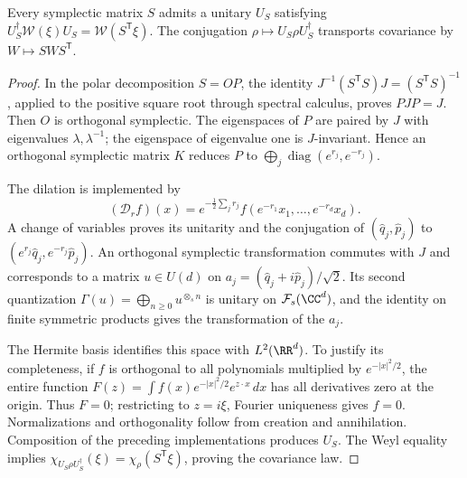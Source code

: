 \begin{lemma}
\label{app:lem:implementacion-simplectica}
Every symplectic matrix \(S\) admits a unitary \(U_S\) satisfying \(U_S^\dagger\mathcal W(\xi)U_S=\mathcal W(S^{\mathsf T}\xi)\). The conjugation \(\rho\mapsto U_S\rho U_S^\dagger\) transports covariance by \(W\mapsto SWS^{\mathsf T}\).
\end{lemma}
\begin{proof}
In the polar decomposition \(S=OP\), the identity \(J^{-1}(S^{\mathsf T}S)J=(S^{\mathsf T}S)^{-1}\), applied to the positive square root through spectral calculus, proves \(PJP=J\). Then \(O\) is orthogonal symplectic. The eigenspaces of \(P\) are paired by \(J\) with eigenvalues \(\lambda,\lambda^{-1}\); the eigenspace of eigenvalue one is \(J\)-invariant. Hence an orthogonal symplectic matrix \(K\) reduces \(P\) to \(\bigoplus_j\operatorname{diag}(e^{r_j},e^{-r_j})\).

The dilation is implemented by
\[
 (\mathcal D_rf)(x)=e^{-\frac12\sum_jr_j}
 f(e^{-r_1}x_1,\ldots,e^{-r_d}x_d).
\]
A change of variables proves its unitarity and the conjugation of \((\widehat q_j,\widehat p_j)\) to \((e^{r_j}\widehat q_j,e^{-r_j}\widehat p_j)\). An orthogonal symplectic transformation commutes with \(J\) and corresponds to a matrix \(u\in U(d)\) on \(a_j=(\widehat q_j+i\widehat p_j)/\sqrt2\). Its second quantization \(\Gamma(u)=\bigoplus_{n\geq0}u^{\otimes_s n}\) is unitary on \(\mathcal F_s(\CC^d)\), and the identity on finite symmetric products gives the transformation of the \(a_j\).

The Hermite basis identifies this space with \(L^2(\RR^d)\). To justify its completeness, if \(f\) is orthogonal to all polynomials multiplied by \(e^{-|x|^2/2}\), the entire function \(F(z)=\int f(x)e^{-|x|^2/2}e^{z\cdot x}\,dx\) has all derivatives zero at the origin. Thus \(F=0\); restricting to \(z=i\xi\), Fourier uniqueness gives \(f=0\). Normalizations and orthogonality follow from creation and annihilation. Composition of the preceding implementations produces \(U_S\). The Weyl equality implies \(\chi_{U_S\rho U_S^\dagger}(\xi)=\chi_\rho(S^{\mathsf T}\xi)\), proving the covariance law.
\end{proof}

